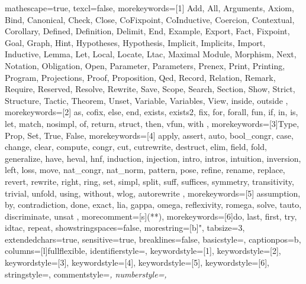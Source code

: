 
 {
mathescape=true,						
texcl=false,
morekeywords=[1]{
  Add,
  All,
  Arguments,
  Axiom,
  Bind,
  Canonical,
  Check,
  Close,
  CoFixpoint,
  CoInductive,
  Coercion,
  Contextual,
  Corollary,
  Defined,
  Definition,
  Delimit,
  End,
  Example,
  Export,
  Fact,
  Fixpoint,
  Goal,
  Graph,
  Hint,
  Hypotheses,
  Hypothesis,
  Implicit,
  Implicits,
  Import,
  Inductive,
  Lemma,
  Let,
  Local,
  Locate,
  Ltac,
  Maximal
  Module,
  Morphism,
  Next,
  Notation,
  Obligation,
  Open,
  Parameter,
  Parameters,
  Prenex,
  Print,
  Printing,
  Program,
  Projections,
  Proof,
  Proposition,
  Qed,
  Record,
  Relation,
  Remark,
  Require,
  Reserved,
  Resolve,
  Rewrite,
  Save,
  Scope,
  Search,
  Section,
  Show,
  Strict,
  Structure,
  Tactic,
  Theorem,
  Unset,
  Variable,
  Variables,
  View,
  inside,
  outside
},
morekeywords=[2]{
  as,
  cofix,
  else,
  end,
  exists,
  exists2,
  fix,
  for,
  forall,
  fun,
  if,
  in,
  is,
  let,
  match,
  nosimpl,
  of,
  return,
  struct,
  then,
  vfun,
  with
},
morekeywords=[3]{Type, Prop, Set, True, False},
morekeywords=[4]{
  apply,
  assert,
  auto,
  bool_congr,
  case,
  change,
  clear,
  compute,
  congr,
  cut,
  cutrewrite,
  destruct,
  elim,
  field,
  fold,
  generalize,
  have,
  heval, 
  hnf,
  induction,
  injection,
  intro,
  intros,
  intuition,
  inversion,
  left,
  loss,
  move,
  nat_congr,
  nat_norm,
  pattern,
  pose,
  refine,
  rename,
  replace,
  revert,
  rewrite,
  right,
  ring,
  set,
  simpl,
  split,
  suff,
  suffices,
  symmetry,
  transitivity,
  trivial,
  unfold,
  using,
  without,
  wlog,
  autorewrite
},        
morekeywords=[5]{
  assumption,
  by,
  contradiction,
  done,
  exact,
  lia,
  gappa,
  omega,
  reflexivity,
  romega,
  solve,
  tauto,
  discriminate,
  unsat
},
morecomment=[s]{(*}{*)},
morekeywords=[6]{do, last, first, try, idtac, repeat},
showstringspaces=false,
morestring=[b]",
tabsize=3,							
extendedchars=true,  		 		
sensitive=true, 
breaklines=false,
basicstyle=\small\ttfamily,
captionpos=b,							
columns=[l]fullflexible,
identifierstyle={\color{black}},
keywordstyle=[1]{\color{violet}},
keywordstyle=[2]{\color{forestgreen}},
keywordstyle=[3]{\color{forestgreen}},
keywordstyle=[4]{\color{blue}},
keywordstyle=[5]{\color{red}},
keywordstyle=[6]{\color{violet}},
stringstyle=,
commentstyle=\it\ttfamily\color{Bittersweet},
numberstyle=\tiny,
}

